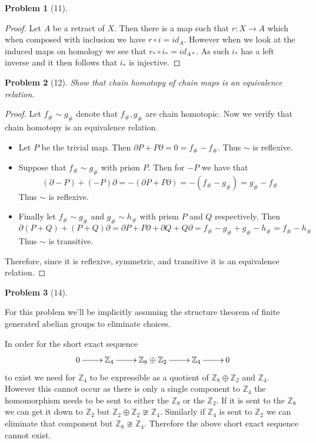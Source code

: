 \documentclass[10pt]{article}
\newcommand{\sk}{\vskip 10mm}
\newcommand{\bb}[1]{\mathbb{#1}}
\theoremstyle{plain}
\newtheorem{problem}{Problem}
\theoremstyle{remark}
\begin{document}
\begin{problem}[11]
  
\end{problem}

\begin{proof}
  Let $A$ be a retract of $X$. Then there is a map such that
  $r:X\rightarrow A$ which when composed with inclusion we have
  $r\circ i= id_A$. However when we look at the induced maps on
  homology we see that $r_*\circ i_*=id_{A*}$. As such $i_*$ has
  a left inverse and it then follows that $i_*$ is injective.
\end{proof}

\sk

\begin{problem}[12]
  Show that chain homotopy of chain maps is an equivalence relation.
\end{problem}

\begin{proof}
  Let $f_\#\sim g_\#$ denote that $f_\#,g_\#$ are chain homotopic. Now we verify
  that chain homotopy is an equivalence relation.

  \begin{itemize}
  \item
    Let $P$ be the trivial map. Then $\partial P + P\partial=0=f_\#-f_\#$. Thus
    $\sim$ is reflexive.
  \item
    Suppose that $f_\#\sim g_\#$ with prism $P$. Then for $-P$ we
    have that
    \[(\partial -P)+(-P)\partial = -(\partial P+P\partial)=-(f_\#-g_\#)=g_\#-f_\#\]
    Thus $\sim$ is reflexive.
  \item
    Finally let $f_\#\sim g_\#$ and $g_\#\sim h_\#$ with prism $P$ and $Q$ respectively.
    Then
    \[ \partial(P+Q) +(P+Q)\partial = \partial P + P\partial+\partial Q + Q\partial=f_\#-g_\#+g_\#-h_\#=f_\#-h_\# \]
    Thus $\sim$ is transitive.
  \end{itemize}

  Therefore, since it is reflexive, symmetric, and transitive it is an equivalence relation.
\end{proof}

\sk

\begin{problem}[14]
  
\end{problem}

For this problem we'll be implicitly assuming the structure theorem of finite
generated abelian groups to eliminate choices.


In order for the short exact sequence
\[
  \xymatrix{0 \ar[r] & \bb{Z}_4 \ar[r] & \bb{Z}_8\oplus \bb{Z}_2\ar[r] &\bb{Z}_4 \ar[r] & 0}
\]
to exist we need for $\bb{Z}_4$ to be expressible as a quotient of
$\bb{Z}_8\oplus \bb{Z}_2$ and $\bb{Z}_4$. However this cannot occur as there is only
a single component to $\bb{Z}_4$ the homomorphism needs to be sent to either
the $\bb{Z}_8$ or the $\bb{Z}_2$. If it is sent to the $\bb{Z}_8$ we can get it
down to $\bb{Z}_2$ but $\bb{Z}_2\oplus\bb{Z}_2\ncong \bb{Z}_4$. Similarly if
$\bb{Z}_4$ is sent to $\bb{Z}_2$ we can eliminate that component but
$\bb{Z}_8\ncong \bb{Z}_4$. Therefore the above short exact sequence cannot
exist.
\end{document}
